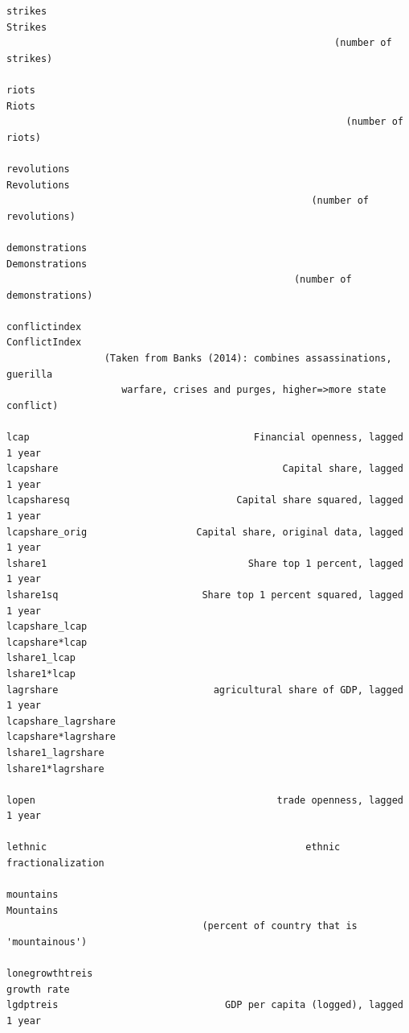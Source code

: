 \documentclass[12pt]{article}
\begin{document}
\begin{verbatim}
strikes                                                              Strikes
                                                         (number of strikes)

riots                                                                  Riots
                                                           (number of riots)

revolutions                                                      Revolutions
                                                     (number of revolutions)

demonstrations                                                Demonstrations
                                                  (number of demonstrations)

conflictindex                                                  ConflictIndex 
                 (Taken from Banks (2014): combines assassinations, guerilla
                    warfare, crises and purges, higher=>more state conflict)

lcap                                       Financial openness, lagged 1 year
lcapshare                                       Capital share, lagged 1 year
lcapsharesq                             Capital share squared, lagged 1 year
lcapshare_orig                   Capital share, original data, lagged 1 year
lshare1                                   Share top 1 percent, lagged 1 year
lshare1sq                         Share top 1 percent squared, lagged 1 year
lcapshare_lcap                                                lcapshare*lcap
lshare1_lcap                                                    lshare1*lcap
lagrshare                           agricultural share of GDP, lagged 1 year
lcapshare_lagrshare                                      lcapshare*lagrshare
lshare1_lagrshare                                          lshare1*lagrshare

lopen                                          trade openness, lagged 1 year

lethnic                                             ethnic fractionalization

mountains                                                          Mountains
                                  (percent of country that is 'mountainous')
                                     
lonegrowthtreis                                                  growth rate
lgdptreis                             GDP per capita (logged), lagged 1 year


\end{verbatim}
\end{document}
